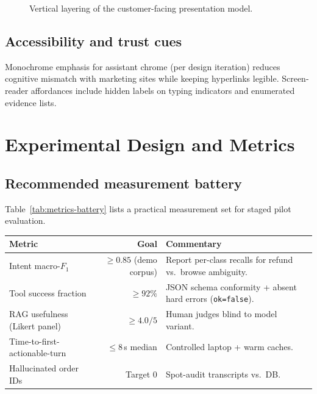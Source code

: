 \documentclass[11pt,a4paper,twoside]{report}
\begin{document}
\begin{figure}[htbp]
\centering
{}
\caption{Vertical layering of the customer-facing presentation model.}
\label{fig:ui-layers}
\end{figure}

\section{Accessibility and trust cues}
Monochrome emphasis for assistant chrome (per design iteration) reduces cognitive mismatch with marketing sites while keeping hyperlinks legible.
Screen-reader affordances include hidden labels on typing indicators and enumerated evidence lists.

\chapter{Experimental Design and Metrics}

\section{Recommended measurement battery}
Table~\ref{tab:metrics-battery} lists a practical measurement set for staged pilot evaluation.

\begin{tabularx}{\textwidth}{@{} l r X @{}}
  \toprule
  Metric & Goal & Commentary\\
  \midrule
  Intent macro-$F_1$ & $\geq 0.85$ (demo corpus) & Report per-class recalls for refund vs.\ browse ambiguity.\\
  Tool success fraction & $\geq 92\%$ & JSON schema conformity + absent hard errors (\texttt{ok=false}).\\
  RAG usefulness (Likert panel) & $\geq 4.0/5$ & Human judges blind to model variant.\\
  Time-to-first-actionable-turn & $\leq 8$\,s median & Controlled laptop + warm caches.\\
  Hallucinated order IDs & Target 0 & Spot-audit transcripts vs.\ DB.\\
  \bottomrule
\end{tabularx}
\vspace{.5ex}%
\label{tab:metrics-battery}
\end{document}
